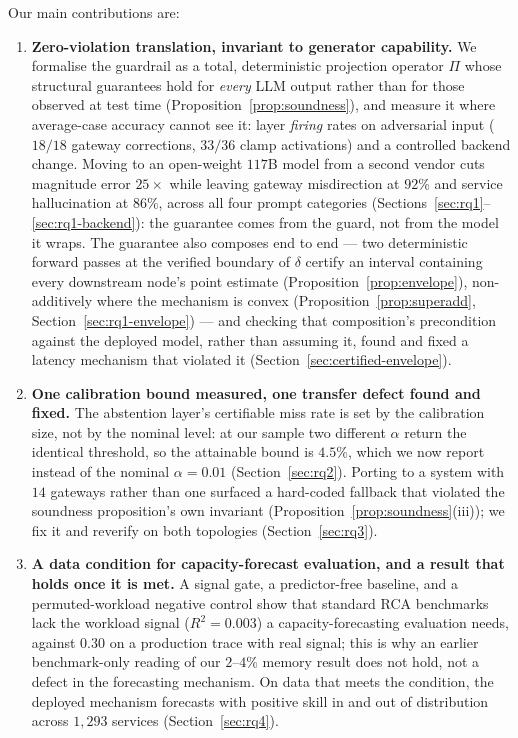 \documentclass[journal, 10pt]{IEEEtran}
\begin{document}
Our main contributions are:
\begin{enumerate}
    \item \textbf{Zero-violation translation, invariant to generator capability.} We formalise the guardrail as a total, deterministic projection operator $\Pi$ whose structural guarantees hold for \emph{every} LLM output rather than for those observed at test time (Proposition~\ref{prop:soundness}), and measure it where average-case accuracy cannot see it: layer \emph{firing} rates on adversarial input ($18/18$ gateway corrections, $33/36$ clamp activations) and a controlled backend change. Moving to an open-weight $117$B model from a second vendor cuts magnitude error $25{\times}$ while leaving gateway misdirection at $92\%$ and service hallucination at $86\%$, across all four prompt categories (Sections~\ref{sec:rq1}--\ref{sec:rq1-backend}): the guarantee comes from the guard, not from the model it wraps. The guarantee also composes end to end --- two deterministic forward passes at the verified boundary of $\delta$ certify an interval containing every downstream node's point estimate (Proposition~\ref{prop:envelope}), non-additively where the mechanism is convex (Proposition~\ref{prop:superadd}, Section~\ref{sec:rq1-envelope}) --- and checking that composition's precondition against the deployed model, rather than assuming it, found and fixed a latency mechanism that violated it (Section~\ref{sec:certified-envelope}).
    \item \textbf{One calibration bound measured, one transfer defect found and fixed.} The abstention layer's certifiable miss rate is set by the calibration size, not by the nominal level: at our sample two different $\alpha$ return the identical threshold, so the attainable bound is $4.5\%$, which we now report instead of the nominal $\alpha=0.01$ (Section~\ref{sec:rq2}). Porting to a system with $14$ gateways rather than one surfaced a hard-coded fallback that violated the soundness proposition's own invariant (Proposition~\ref{prop:soundness}(iii)); we fix it and reverify on both topologies (Section~\ref{sec:rq3}).
    \item \textbf{A data condition for capacity-forecast evaluation, and a result that holds once it is met.} A signal gate, a predictor-free baseline, and a permuted-workload negative control show that standard RCA benchmarks lack the workload signal ($R^2{=}0.003$) a capacity-forecasting evaluation needs, against $0.30$ on a production trace with real signal; this is why an earlier benchmark-only reading of our $2$--$4\%$ memory result does not hold, not a defect in the forecasting mechanism. On data that meets the condition, the deployed mechanism forecasts with positive skill in and out of distribution across $1{,}293$ services (Section~\ref{sec:rq4}).

\end{enumerate}
\end{document}
